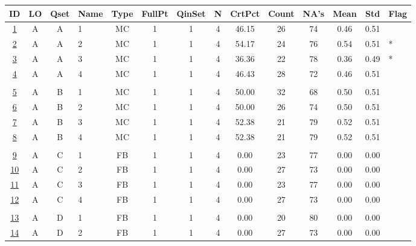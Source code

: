 \documentclass[12pt,nohyper]{tufte-handout}\usepackage[]{graphicx}\usepackage[]{color}
\begin{document}
\begin{longtable}{cccl|cccc|ccccc|l}
  \hline
ID & LO & Qset & Name & Type & FullPt & QinSet & N & CrtPct & Count & NA's & Mean & Std & Flag \\ 
  \hline
\hyperlink{T06.A.A.04.1.1.MC.1.2}{1} & A & A & 1 & MC &   1 &   1 &   4 & 46.15 &  26 &  74 & 0.46 & 0.51 &  \\ 
  \hyperlink{T06.A.A.04.1.1.MC.2.2}{2} & A & A & 2 & MC &   1 &   1 &   4 & 54.17 &  24 &  76 & 0.54 & 0.51 & * \\ 
  \hyperlink{T06.A.A.04.1.1.MC.3.2}{3} & A & A & 3 & MC &   1 &   1 &   4 & 36.36 &  22 &  78 & 0.36 & 0.49 & * \\ 
  \hyperlink{T06.A.A.04.1.1.MC.4.2}{4} & A & A & 4 & MC &   1 &   1 &   4 & 46.43 &  28 &  72 & 0.46 & 0.51 &  \\ 
   &  &  &  &  &  &  &  &  &  &  &  &  &  \\ 
  \hyperlink{T06.A.B.04.1.1.MC.1.2}{5} & A & B & 1 & MC &   1 &   1 &   4 & 50.00 &  32 &  68 & 0.50 & 0.51 &  \\ 
  \hyperlink{T06.A.B.04.1.1.MC.2.2}{6} & A & B & 2 & MC &   1 &   1 &   4 & 50.00 &  26 &  74 & 0.50 & 0.51 &  \\ 
  \hyperlink{T06.A.B.04.1.1.MC.3.2}{7} & A & B & 3 & MC &   1 &   1 &   4 & 52.38 &  21 &  79 & 0.52 & 0.51 &  \\ 
  \hyperlink{T06.A.B.04.1.1.MC.4.2}{8} & A & B & 4 & MC &   1 &   1 &   4 & 52.38 &  21 &  79 & 0.52 & 0.51 &  \\ 
   &  &  &  &  &  &  &  &  &  &  &  &  &  \\ 
  \hyperlink{T06.A.C.04.1.1.FB.1.2}{9} & A & C & 1 & FB &   1 &   1 &   4 & 0.00 &  23 &  77 & 0.00 & 0.00 &  \\ 
  \hyperlink{T06.A.C.04.1.1.FB.2.2}{10} & A & C & 2 & FB &   1 &   1 &   4 & 0.00 &  27 &  73 & 0.00 & 0.00 &  \\ 
  \hyperlink{T06.A.C.04.1.1.FB.3.2}{11} & A & C & 3 & FB &   1 &   1 &   4 & 0.00 &  23 &  77 & 0.00 & 0.00 &  \\ 
  \hyperlink{T06.A.C.04.1.1.FB.4.2}{12} & A & C & 4 & FB &   1 &   1 &   4 & 0.00 &  27 &  73 & 0.00 & 0.00 &  \\ 
   &  &  &  &  &  &  &  &  &  &  &  &  &  \\ 
  \hyperlink{T06.A.D.04.1.1.FB.1.2}{13} & A & D & 1 & FB &   1 &   1 &   4 & 0.00 &  20 &  80 & 0.00 & 0.00 &  \\ 
  \hyperlink{T06.A.D.04.1.1.FB.2.2}{14} & A & D & 2 & FB &   1 &   1 &   4 & 0.00 &  27 &  73 & 0.00 & 0.00 &  \\ 

\end{longtable}
\end{document}
